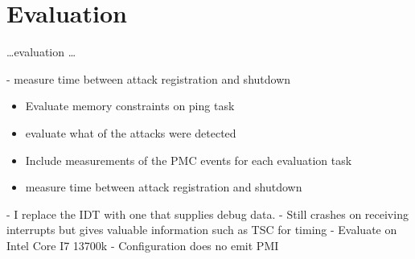 \chapter{Evaluation}
\label{sec:evaluation}


\ldots evaluation \ldots

- measure time between attack registration and shutdown
\begin{itemize}
    \item Evaluate memory constraints on ping task
    \item evaluate what of the attacks were detected
    \item Include measurements of the PMC events for each evaluation task
    \item measure time between attack registration and shutdown
\end{itemize}
- I replace the IDT with one that supplies debug data.
- Still crashes on receiving interrupts but gives valuable information such as TSC for timing
- Evaluate on Intel Core I7 13700k
- Configuration does no emit PMI

